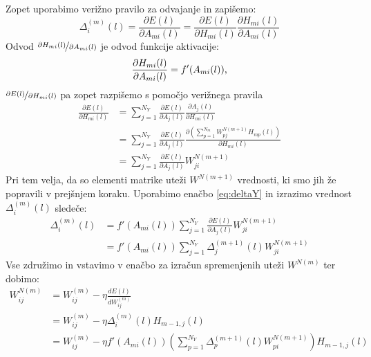 \documentclass[mat1]{fmfdelo}
\begin{document}
Zopet uporabimo verižno pravilo za odvajanje in zapišemo:
%
\begin{equation*}
\Delta^{(m)}_i(l) = \frac{\partial E(l)}{\partial A_{mi}(l)}  = \frac{\partial E(l)}{\partial H_{mi}(l)}\frac{\partial H_{mi}(l)}{\partial A_{mi}(l)}
\end{equation*}
%
Odvod $\nicefrac{\partial H_{mi}(l)}{\partial A_{mi}(l)}$ je odvod funkcije aktivacije:
%
\begin{equation*}
\frac{\partial H_{mi}(l)}{\partial A_{mi}(l)} =  f'(A_{mi}(l)) \text,
\end{equation*}
%
$\nicefrac{\partial E(l)}{\partial H_{mi}(l)}$ pa zopet razpišemo s pomočjo verižnega pravila
%
\begin{equation*}
\begin{aligned}
\frac{\partial E(l)}{\partial H_{mi}(l)} &=  \sum^{N_Y}_{j=1} \frac{\partial E(l)}{\partial A_j(l)}\frac{\partial A_j(l)}{\partial H_{mi}(l)}  \\
& =   \sum^{N_Y}_{j=1} \frac{\partial E(l)}{\partial A_j(l)}\frac{\partial(\sum^{N_m}_{p=1} W^{N (m+1)}_{pj}H_{mp}(l))}{\partial H_{mi}(l)} \\
&= \sum^{N_Y}_{j=1} \frac{\partial E(l)}{\partial A_j(l)} W^{N (m+1)}_{ji}
\end{aligned}
\end{equation*}
%
Pri tem velja, da so elementi matrike uteži $W^{N(m+1)}$ vrednosti, ki smo jih že popravili v prejšnjem koraku. Uporabimo enačbo \eqref{eq:deltaY} in izrazimo vrednost $\Delta^{(m)}_i(l)$ sledeče:
%
\begin{equation*}
\begin{aligned}
\Delta^{(m)}_i(l) &= f'(A_{mi}(l))  \sum^{N_Y}_{j=1} \frac{\partial E(l)}{\partial A_j(l)} W^{N (m+1)}_{ji} \\
&= f'(A_{mi}(l))  \sum^{N_Y}_{j=1} \Delta ^{(m+1)}_j(l)W^{N (m+1)}_{ji}
\end{aligned}
\end{equation*}
%
Vse združimo in vstavimo v enačbo za izračun spremenjenih uteži $W^{N(m)}$ ter dobimo:
%
\begin{equation}
\begin{aligned}
W^{N(m)}_{ij} &= W^{(m)}_{ij} - \eta\frac{dE(l)}{dW_{ij}^{(m)}} \\
&= W ^{(m)}_{ij} -\eta  \Delta^{(m)}_i (l)H_{m-1,j}(l)\\
&= W ^{(m)}_{ij} -\eta f'(A_{mi}(l))  \left(\sum^{N_Y}_{p=1} \Delta ^{(m+1)}_p(l)W^{N (m+1)}_{pi}\right)H_{m-1,j}(l)\\
\end{aligned}
\end{equation}
\end{document}

